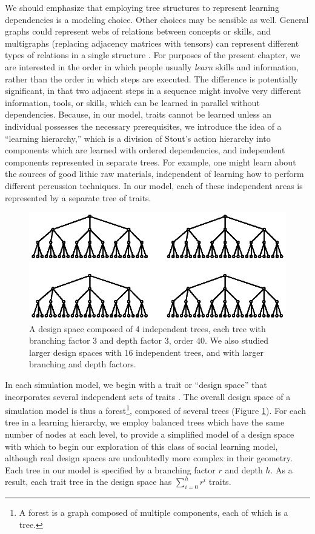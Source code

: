 We should emphasize that employing tree structures to represent learning
dependencies is a modeling choice. Other choices may be sensible as
well. General graphs could represent webs of relations between concepts
or skills, and multigraphs (replacing adjacency matrices with tensors)
can represent different types of relations in a single structure
\citep{ICML2011Nickel_438}. For purposes of the present chapter, we are
interested in the order in which people usually \emph{learn} skills and
information, rather than the order in which steps are executed. The
difference is potentially significant, in that two adjacent steps in a
sequence might involve very different information, tools, or skills,
which can be learned in parallel without dependencies. Because, in our
model, traits cannot be learned unless an individual possesses the
necessary prerequisites, we introduce the idea of a ``learning
hierarchy,'' which is a division of Stout's action hierarchy into
components which are learned with ordered dependencies, and independent
components represented in separate trees. For example, one might learn
about the sources of good lithic raw materials, independent of learning
how to perform different percussion techniques. In our model, each of
these independent areas is represented by a separate tree of traits.

\begin{figure}[h] 
\centering 
\includegraphics[scale=0.6]{graphics/semanticaxelrod/design-space-4-trees.eps} 
\caption{A design space composed of 4 independent trees, each tree with branching factor 3 and depth factor 3, order 40.  We also studied larger design spaces with 16 independent trees, and with larger branching and depth factors.} 
\label{semax:img:design-space-4} 
\end{figure}

In each simulation model, we begin with a trait or ``design space'' that
incorporates several independent sets of traits \citep{o2010cultural}.
The overall design space of a simulation model is thus a
forest\footnote{A forest is a graph composed of multiple components,
  each of which is a tree.}, composed of several trees (Figure
\ref{semax:img:design-space-4}). For each tree in a learning hierarchy, we
employ balanced trees which have the same number of nodes at each level,
to provide a simplified model of a design space with which to begin our
exploration of this class of social learning model, although real design
spaces are undoubtedly more complex in their geometry. Each tree in our
model is specified by a branching factor $r$ and depth $h$. As a result,
each trait tree in the design space has $\sum_{i=0}^{h} r^i$ traits.

